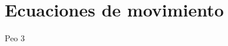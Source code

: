\documentclass[../main.tex]{subfiles}
\begin{document}
\section{Ecuaciones de movimiento}
Peo 3
 
\end{document}
